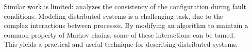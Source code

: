 Similar work is limited: \cite{LEADERELECTIONEVAL} analyzes the consistency of the configuration during fault conditions.
Modeling distributed systems is a challenging task, due to the complex interactions between processes.
By modifying an algorithm to maintain a common property of Markov chains, some of these interactions can be tamed.
This yields a practical and useful technique for describing distributed systems.
